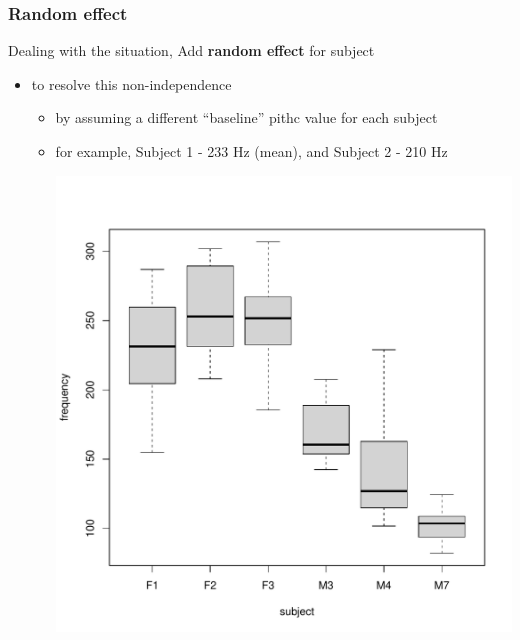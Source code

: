 \documentclass[10p]{beamer}\usepackage[]{graphicx}\usepackage[]{color}
\begin{document}
\begin{frame}
\frametitle{Random effect}
Dealing with the situation, Add \textbf{random effect} for subject
\begin{itemize}
\item to resolve this non-independence 
	\begin{itemize}
	\item by assuming a different ``baseline'' pithc value for each subject
	\item for example, Subject 1 - 233 Hz (mean), and Subject 2 - 210 Hz



\centering
\includegraphics[scale=.3]{figure/box_subject-1}

	\end{itemize}
\end{itemize}
\end{frame}
\end{document}
